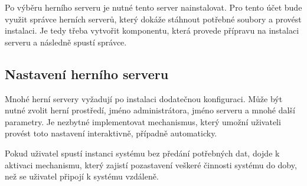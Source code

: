 Po výběru herního serveru je nutné tento server nainstalovat. Pro tento účet bude využit správce herních serverů, který dokáže stáhnout potřebné soubory
a provést instalaci. Je tedy třeba vytvořit komponentu, která provede přípravu na instalaci serveru a následně spustí správce.

\subsection{Nastavení herního serveru}

Mnohé herní servery vyžadují po instalaci dodatečnou konfiguraci. Může být nutné zvolit herní prostředí, jméno administrátora, jméno serveru a mnohé další parametry.
Je nezbytné implementovat mechanismus, který umožní uživateli provést toto nastavení interaktivně, případně automaticky.

Pokud uživatel spustí instanci systému bez předání potřebných dat, dojde k aktivaci mechanismu, který zajistí pozastavení veškeré činnosti systému do doby, než
se uživatel připojí k systému vzdáleně.





